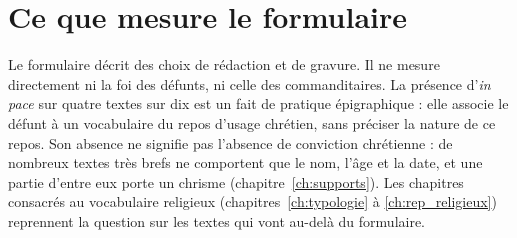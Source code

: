 \section{Ce que mesure le formulaire}

Le formulaire décrit des choix de rédaction et de gravure. Il ne mesure directement ni la foi des défunts, ni celle des commanditaires. La présence d’\emph{in pace} sur quatre textes sur dix est un fait de pratique épigraphique : elle associe le défunt à un vocabulaire du repos d’usage chrétien, sans préciser la nature de ce repos. Son absence ne signifie pas l’absence de conviction chrétienne : de nombreux textes très brefs ne comportent que le nom, l’âge et la date, et une partie d’entre eux porte un chrisme (chapitre~\ref{ch:supports}). Les chapitres consacrés au vocabulaire religieux (chapitres~\ref{ch:typologie} à \ref{ch:rep_religieux}) reprennent la question sur les textes qui vont au-delà du formulaire.
